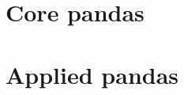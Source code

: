 \documentclass[openany]{book}
\begin{document}
\mainmatter
\part{Core pandas}
% 
% 
% 


\part{Applied pandas}


\end{document}
